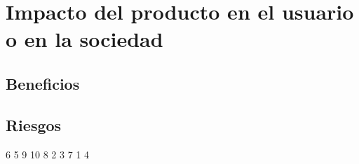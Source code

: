 \section{Impacto del producto en el usuario o en la sociedad}
\cite{noauthor_new_nodate}
\cite{noauthor_magnetic_nodate} 

    \subsection{Beneficios}
    \subsection{Riesgos}
    
    
\pagebreak

6 \cite{noauthor_intelligent_nodate} %
5 \cite{noauthor_how_nodate}
9 \cite{noauthor_magnetic_nodate}  %
10 \cite{noauthor_new_nodate} %
8 \cite{justo_exploring_nodate}
2 \cite{noauthor_deep-learning_nodate}
3 \cite{noauthor_ge_nodate}
7 \cite{noauthor_introducing_nodate}
1 \cite{bien_dont_2018}
4 \cite{noauthor_ge_nodate-1}

\sloppy
\printbibliography







\cite{noauthor_intelligent_nodate}

\cite{noauthor_magnetic_nodate}

